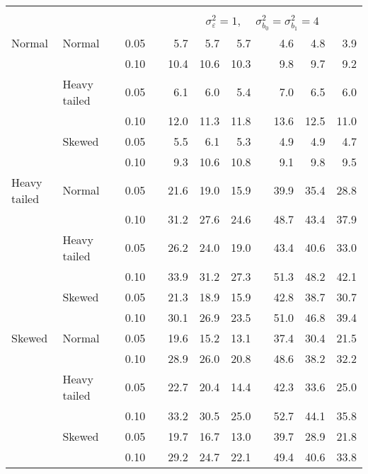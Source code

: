 \begin{table}[ht]
\begin{scriptsize}
\begin{center}
\begin{tabular}{ll p{.1cm} c p{.1cm} rrr p{.1cm} rrr}
&&&&&&&&&&&\\
& && && \multicolumn{7}{c}{$\sigma_{\varepsilon}^2 = 1$, \ \ $\sigma_{b_0}^2 = \sigma_{b_1}^2 = 4$} \\ \cline{6-12}
Normal       & Normal       && 0.05 &&   5.7 & 5.7 & 5.7 &   & 4.6 & 4.8 & 3.9 \\ 
             &              && 0.10 &&   10.4 & 10.6 & 10.3 &   & 9.8 & 9.7 & 9.2 \\ 
             & Heavy tailed && 0.05 &&   6.1 & 6.0 & 5.4 &   & 7.0 & 6.5 & 6.0 \\ 
             &              && 0.10 &&   12.0 & 11.3 & 11.8 &   & 13.6 & 12.5 & 11.0 \\ 
             & Skewed       && 0.05 &&   5.5 & 6.1 & 5.3 &   & 4.9 & 4.9 & 4.7 \\ 
             &              && 0.10 &&   9.3 & 10.6 & 10.8 &   & 9.1 & 9.8 & 9.5 \\ 
Heavy tailed & Normal       && 0.05 &&   21.6 & 19.0 & 15.9 &   & 39.9 & 35.4 & 28.8 \\ 
             &              && 0.10 &&   31.2 & 27.6 & 24.6 &   & 48.7 & 43.4 & 37.9 \\ 
             & Heavy tailed && 0.05 &&   26.2 & 24.0 & 19.0 &   & 43.4 & 40.6 & 33.0 \\ 
             &              && 0.10 &&   33.9 & 31.2 & 27.3 &   & 51.3 & 48.2 & 42.1 \\ 
             & Skewed       && 0.05 &&   21.3 & 18.9 & 15.9 &   & 42.8 & 38.7 & 30.7 \\ 
             &              && 0.10 &&   30.1 & 26.9 & 23.5 &   & 51.0 & 46.8 & 39.4 \\ 
Skewed       & Normal       && 0.05 &&   19.6 & 15.2 & 13.1 &   & 37.4 & 30.4 & 21.5 \\ 
             &              && 0.10 &&   28.9 & 26.0 & 20.8 &   & 48.6 & 38.2 & 32.2 \\ 
             & Heavy tailed && 0.05 &&   22.7 & 20.4 & 14.4 &   & 42.3 & 33.6 & 25.0 \\ 
             &              && 0.10 &&   33.2 & 30.5 & 25.0 &   & 52.7 & 44.1 & 35.8 \\ 
             & Skewed       && 0.05 &&   19.7 & 16.7 & 13.0 &   & 39.7 & 28.9 & 21.8 \\ 
             &              && 0.10 &&   29.2 & 24.7 & 22.1 &   & 49.4 & 40.6 & 33.8 \\ 

\hline
\end{tabular}
\end{center}
\end{scriptsize}
\end{table}

